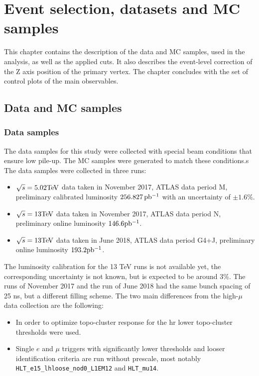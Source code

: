 \chapter{Event selection, datasets and MC samples}
    \label{sec:samples_selection}
    This chapter contains the description of the data and MC samples, used in the analysis, as well as the applied cuts. It also describes the event-level correction of the Z axis position of the primary vertex. The chapter concludes with the set of control plots of the main observables.
    \section{Data and MC samples}
     \subsection{Data samples}
    The data samples for this study were collected with special beam conditions that ensure low pile-up. The MC samples were generated to match these conditions.s The data samples were collected in three runs:
    \begin{itemize}
    \item $\sqrt{s} = 5.02\text{Te\kern -0.1em V}$ data taken in November 2017, ATLAS data
    period M, preliminary calibrated luminosity $256.827\,\mbox{pb\(^{-1}\)}$ with an uncertainty
    of $\pm 1.6\%$.
    \item $\sqrt{s} = 13\text{Te\kern -0.1em V}$ data taken in November 2017, ATLAS data
    period N, preliminary online luminosity $146.6\mbox{pb\(^{-1}\)}$.
    \item $\sqrt{s} = 13\text{Te\kern -0.1em V}$ data taken in June 2018, ATLAS data
    period G4+J, preliminary online luminosity $193.2\mbox{pb\(^{-1}\)}$.
    \end{itemize}

	The luminosity  calibration for the 13 TeV runs is not available yet, the corresponding uncertainty is not known, but is expected to be around 3\%. The runs of November 2017 and the run of June 2018 had the same bunch spacing of 25 ns, but a different filling scheme. The two main differences from the high-$\mu$ data collection are the following:
	\begin{itemize}
	\item In order to optimize topo-cluster response for the \gls{hr} lower topo-cluster thresholds were used. 
	\item Single $e$ and $\mu$ triggers with significantly lower
	thresholds and looser identification criteria are run without
	prescale, most notably \texttt{HLT\_e15\_lhloose\_nod0\_L1EM12} and
	\texttt{HLT\_mu14}.
	\end{itemize}	

